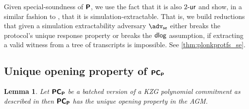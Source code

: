 \let\accentvec\vec \documentclass[runningheads]{llncs}
\newtheorem{lemma}[theorem]{Lemma}
\begin{document}
Given special-soundness of $\bm{\mathsf{P}}$, we use the fact that it is also
${2\text{-}\mathsf{ur}}$ and show, in a similar fashion to \cite{INDOCRYPT:FKMV12}, that it is
simulation-extractable. That is, we build reductions that given a simulation
extractability adversary $\advse$ either breaks the protocol's unique response
property or breaks the $\mathsf{dlog}$ assumption, if extracting a valid witness from a
tree of transcripts is impossible. See \cref{thm:plonkprotfs_se}.

\subsection{Unique opening property of $\bm{\mathsf{PC}}_{\bm{\mathsf{P}}}$}
\begin{lemma}
\label{lem:pcomp_unique_op}
Let $\bm{\mathsf{PC}}_{\bm{\mathsf{P}}}$ be a batched version of a KZG polynomial commitment
\cite{AC:KatZavGol10} as described in \cite{EPRINT:GabWilCio19} then $\bm{\mathsf{PC}}_{\bm{\mathsf{P}}}$
has the unique opening property in the AGM. 
\end{lemma}
\end{document}
